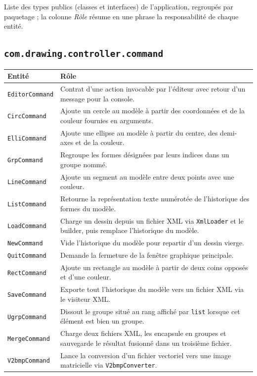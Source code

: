 \documentclass[11pt,a4paper]{article}
\begin{document}
Liste des types publics (classes et interfaces) de l'application, regroupés par paquetage ; la colonne \emph{Rôle} résume en une phrase la responsabilité de chaque entité.

\subsection{\protect\texttt{com.drawing.controller.command}}

\begin{tabular}{|>{\raggedright\arraybackslash}p{}|p{}|}
\hline
\textbf{Entité} & \textbf{Rôle} \\
\hline
\texttt{EditorCommand} & Contrat d'une action invocable par l'éditeur avec retour d'un message pour la console. \\
\hline
\texttt{CircCommand} & Ajoute un cercle au modèle à partir des coordonnées et de la couleur fournies en arguments. \\
\hline
\texttt{ElliCommand} & Ajoute une ellipse au modèle à partir du centre, des demi-axes et de la couleur. \\
\hline
\texttt{GrpCommand} & Regroupe les formes désignées par leurs indices dans un groupe nommé. \\
\hline
\texttt{LineCommand} & Ajoute un segment au modèle entre deux points avec une couleur. \\
\hline
\texttt{ListCommand} & Retourne la représentation texte numérotée de l'historique des formes du modèle. \\
\hline
\texttt{LoadCommand} & Charge un dessin depuis un fichier XML via \texttt{XmlLoader} et le builder, puis remplace l'historique du modèle. \\
\hline
\texttt{NewCommand} & Vide l'historique du modèle pour repartir d'un dessin vierge. \\
\hline
\texttt{QuitCommand} & Demande la fermeture de la fenêtre graphique principale. \\
\hline
\texttt{RectCommand} & Ajoute un rectangle au modèle à partir de deux coins opposés et d'une couleur. \\
\hline
\texttt{SaveCommand} & Exporte tout l'historique du modèle vers un fichier XML via le visiteur XML. \\
\hline
\texttt{UgrpCommand} & Dissout le groupe situé au rang affiché par \texttt{list} lorsque cet élément est bien un groupe. \\
\hline
\texttt{MergeCommand} & Charge deux fichiers XML, les encapsule en groupes et sauvegarde le résultat fusionné dans un troisième fichier. \\
\hline
\texttt{V2bmpCommand} & Lance la conversion d'un fichier vectoriel vers une image matricielle via \texttt{V2bmpConverter}. \\
\hline
\end{tabular}
\end{document}

